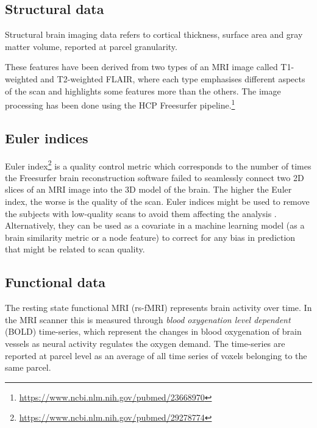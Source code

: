 \subsection{Structural data}
Structural brain imaging data refers to cortical thickness, surface area and gray matter volume, reported at parcel granularity.

These features have been derived from two types of an MRI image called T1-weighted and T2-weighted FLAIR, where each type emphasises different aspects of the scan and highlights some features more than the others. The image processing has been done using the HCP Freesurfer pipeline.\footnote{\url{https://www.ncbi.nlm.nih.gov/pubmed/23668970}} 


\subsection{Euler indices}
Euler index\footnote{\url{https://www.ncbi.nlm.nih.gov/pubmed/29278774}} is a quality control metric which corresponds to the number of times the Freesurfer brain reconstruction software failed to seamlessly connect two 2D slices of an MRI image into the 3D model of the brain. The higher the Euler index, the worse is the quality of the scan. Euler indices might be used to remove the subjects with low-quality scans to avoid them affecting the analysis \cite{kaufmann2019}. Alternatively, they can be used as a covariate in a machine learning model (as a brain similarity metric or a node feature) to correct for any bias in prediction that might be related to scan quality.

\subsection{Functional data}
The resting state functional MRI (rs-fMRI) represents brain activity over time. In the MRI scanner this is measured through \textit{blood oxygenation level dependent} (BOLD) time-series, which represent the changes in blood oxygenation of brain vessels as neural activity regulates the oxygen demand. The time-series are reported at parcel level as an average of all time series of voxels belonging to the same parcel.


